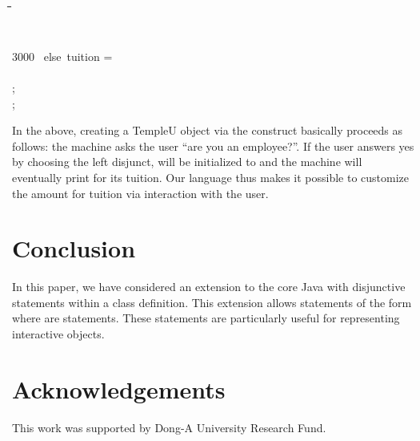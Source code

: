 \documentclass[letter]{ieice}
\newenvironment{exmple}{
 \begingroup \begin{tabbing} \hspace{2em}\= \hspace{3em}\= \hspace{3em}\=
\hspace{3em}\= \hspace{3em}\= \hspace{3em}\= \kill}{
 \end{tabbing}\endgroup}
\begin{document}
\begin{exmple}
 \\
 \\
\\
3000\  \hspace{10em} else\ tuition = \\\
\\
; \\
;\\

\end{exmple}
\noindent In the above, creating a TempleU object via the  construct
 basically proceeds as follows: the machine asks the user ``are you an employee?''.
If the user answers yes by choosing the left disjunct,  will be initialized to
 and the machine will eventually print \employeefalse5000 for its tuition.
Our language thus makes it possible to customize the amount for tuition via
interaction with the user.



\section{Conclusion}\label{sec:conc}

In this paper, we have considered an extension to the core Java with
disjunctive statements within a class definition. This extension allows statements of
the form    where  are statements.
These statements are
 particularly useful for representing interactive objects.




\section{Acknowledgements}

This work  was supported by Dong-A University Research Fund.
\end{document}
